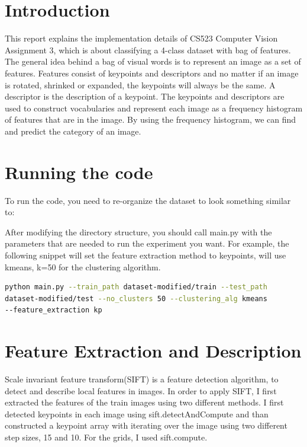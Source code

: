 \section*{Introduction}

This report explains the implementation details of CS523 Computer Vision
Assignment 3, which is about classifying a 4-class dataset with bag of features.
The general idea behind a bag of visual words is to represent an image as a set
of features. Features consist of keypoints and descriptors and no matter if an
image is rotated, shrinked or expanded, the keypoints will always be the same. A
descriptor is the description of a keypoint. The keypoints and descriptors are
used to construct vocabularies and represent each image as a frequency histogram
of features that are in the image. By using the frequency histogram, we can
find and predict the category of an image.

\section*{Running the code}
To run the code, you need to re-organize the dataset to look something similar
to:


After modifying the directory structure, you should call main.py with the
parameters that are needed to run the experiment you want. For example, the
following snippet will set the feature extraction method to keypoints, will use
kmeans, k=50 for the clustering algorithm.


\begin{lstlisting}[language=Bash,title=Running the code,captionpos=b]
python main.py --train_path dataset-modified/train --test_path
dataset-modified/test --no_clusters 50 --clustering_alg kmeans
--feature_extraction kp

\end{lstlisting}


\section*{Feature Extraction and Description}

Scale invariant feature transform(SIFT) is a feature detection algorithm, to detect
and describe local features in images. In order to apply SIFT, I first extracted
the features of the train images using two different methods. I first detected
keypoints in each image using sift.detectAndCompute and than constructed a
keypoint array with iterating over the image using two different step sizes, 15
and 10. For the grids, I used sift.compute.


